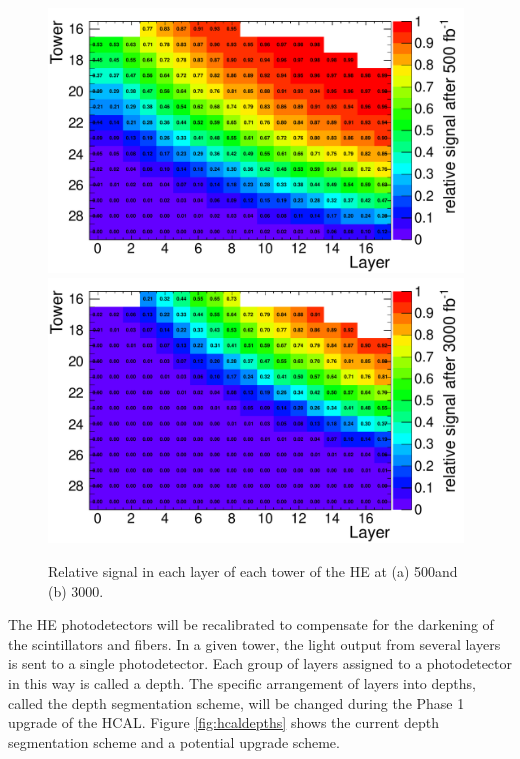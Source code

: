 \begin{figure}[hbtp]
  \begin{center}
    \includegraphics[width=0.98\textwidth]{figures/signal_loss_lumi500.pdf}
    \includegraphics[width=0.98\textwidth]{figures/signal_loss_lumi3000.pdf}
    \caption{Relative signal in each layer of each tower of the HE at (a) 500\fbinv and (b) 3000\fbinv.}
    \label{fig:laserdatasignal}
  \end{center}
\end{figure}

The HE photodetectors will be recalibrated to compensate for the darkening of the scintillators and fibers. In a given tower, the light output from several layers is sent to a single photodetector. Each group of layers assigned to a photodetector in this way is called a depth. The specific arrangement of layers into depths, called the depth segmentation scheme, will be changed during the Phase 1 upgrade of the HCAL. Figure \ref{fig:hcaldepths} shows the current depth segmentation scheme and a potential upgrade scheme.

